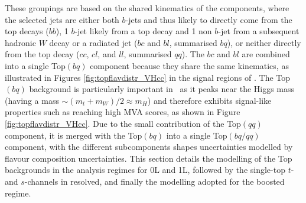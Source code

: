 These groupings are based on the shared kinematics of the components, where the selected jets are either both $b$-jets and thus likely to directly come from the top decays ($bb$), 1 $b$-jet likely from a top decay and 1 non $b$-jet from a subsequent hadronic $W$ decay or a radiated jet ($bc$ and $bl$, summarised $bq$), or neither directly from the top decay ($cc$, $cl$, and $ll$, summarised $qq$). The $bc$ and $bl$ are combined into a single Top$(bq)$ component because they share the same kinematics, as illustrated in Figures \ref{fig:topflavdistr_VHcc} in the signal regions of \vhc. The Top$(bq)$ background is particularly important in \vhc\ as it peaks near the Higgs mass (having a mass $\sim (m_t + m_W) / 2 \approx m_H$) and therefore exhibits signal-like properties such as reaching high MVA scores, as shown in Figure \ref{fig:topflavdistr_VHcc}. Due to the small contribution of the Top$(qq)$ component, it is merged with the Top$(bq)$ into a single Top$(bq/qq)$ component, with the different subcomponents shapes uncertainties modelled by flavour composition uncertainties. This section details the modelling of the Top backgrounds in the analysis regimes for 0L and 1L, followed by the single-top $t$- and $s$-channels in resolved, and finally the modelling adopted for the boosted regime.

